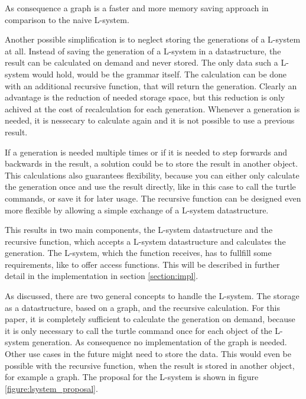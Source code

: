 \documentclass[english]{cpp-hmwk}
\begin{document}
\medskip
\noindent As consequence a graph is a faster and more memory saving approach in comparison to the naive L-system.

\bigskip

\noindent Another possible simplification is to neglect storing the generations of a L-system at all. Instead of saving the generation of a L-system in a datastructure, the result can be calculated on demand and never stored. The only data such a L-system would hold, would be the grammar itself. The calculation can be done with an additional recursive function, that will return the generation. Clearly an advantage is the reduction of needed storage space, but this reduction is only achived at the cost of recalculation for each generation. Whenever a generation is needed, it is nessecary to calculate again and it is not possible to use a previous result.

If a generation is needed multiple times or if it is needed to step forwards and backwards in the result, a solution could be to store the result in another object. This calculations also guarantees flexibility, because you can either only calculate the generation once and use the result directly, like in this case to call the turtle commands, or save it for later usage. The recursive function can be designed even more flexible by allowing a simple exchange of a L-system datastructure.

This results in two main components, the L-system datastructure and the recursive function, which accepts a L-system datastructure and calculates the generation. The L-system, which the function receives, has to fullfill some requirements, like to offer access functions. This will be described in further detail in the implementation in section \ref{section:impl}.
 
\bigskip
 
\noindent As discussed, there are two general concepts to handle the L-system. The storage as a datastructure, based on a graph, and the recursive calculation. For this paper, it is completely sufficient to calculate the generation on demand, because it is only necessary to call the turtle command once for each object of the L-system generation. As consequence no implementation of the graph is needed. Other use cases in the future might need to store the data. This would even be possible with the recursive function, when the result is stored in another object, for example a graph. The proposal for the L-system is shown in figure \ref{figure:lsystem_proposal}.
\end{document}
